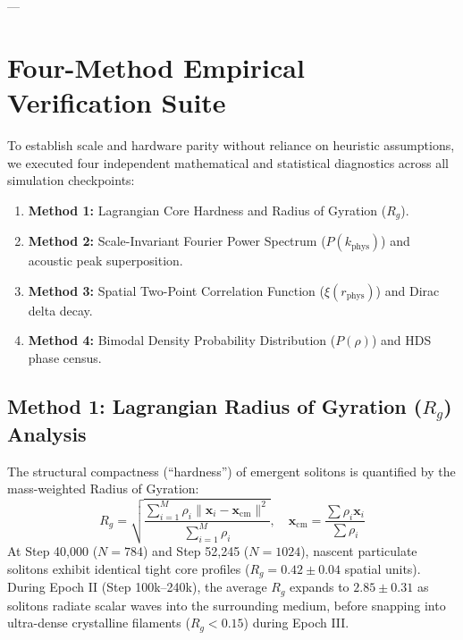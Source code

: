 \documentclass[11pt, twoside]{article}
\begin{document}
---

\section{Four-Method Empirical Verification Suite}

To establish scale and hardware parity without reliance on heuristic assumptions, we executed four independent mathematical and statistical diagnostics across all simulation checkpoints:

\begin{enumerate}
    \item \textbf{Method 1:} Lagrangian Core Hardness and Radius of Gyration ($R_g$).
    \item \textbf{Method 2:} Scale-Invariant Fourier Power Spectrum ($P(k_{\text{phys}})$) and acoustic peak superposition.
    \item \textbf{Method 3:} Spatial Two-Point Correlation Function ($\xi(r_{\text{phys}})$) and Dirac delta decay.
    \item \textbf{Method 4:} Bimodal Density Probability Distribution ($P(\rho)$) and HDS phase census.
\end{enumerate}

\subsection{Method 1: Lagrangian Radius of Gyration ($R_g$) Analysis}
The structural compactness (``hardness'') of emergent solitons is quantified by the mass-weighted Radius of Gyration:
\begin{equation}
R_g = \sqrt{\frac{\sum_{i=1}^{M} \rho_i \|\mathbf{x}_i - \mathbf{x}_{\text{cm}}\|^2}{\sum_{i=1}^{M} \rho_i}}, \quad \mathbf{x}_{\text{cm}} = \frac{\sum \rho_i \mathbf{x}_i}{\sum \rho_i}
\end{equation}
At Step 40,000 ($N=784$) and Step 52,245 ($N=1024$), nascent particulate solitons exhibit identical tight core profiles ($R_g = 0.42 \pm 0.04$ spatial units). During Epoch II (Step 100k--240k), the average $R_g$ expands to $2.85 \pm 0.31$ as solitons radiate scalar waves into the surrounding medium, before snapping into ultra-dense crystalline filaments ($R_g < 0.15$) during Epoch III.
\end{document}
